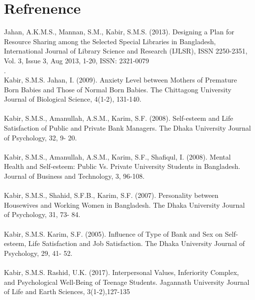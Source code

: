 \documentclass[conference]{IEEEtran}
\begin{document}
 


\section{\textbf{Refrenence}}
Jahan, A.K.M.S., Mannan, S.M.,  Kabir, S.M.S. (2013). Designing a Plan for Resource 
Sharing among the Selected Special Libraries in Bangladesh, International Journal of 
Library Science and Research (IJLSR), ISSN 2250-2351, Vol. 3, Issue 3, Aug 2013, 1-20, 
ISSN: 2321-0079\\.
\\
Kabir, S.M.S.  Jahan, I. (2009). Anxiety Level between Mothers of Premature Born Babies 
and Those of Normal Born Babies. The Chittagong University Journal of Biological 
Science, 4(1-2), 131-140.\\
\\
Kabir, S.M.S., Amanullah, A.S.M.,  Karim, S.F. (2008). Self-esteem and Life Satisfaction of 
Public and Private Bank Managers. The Dhaka University Journal of Psychology, 32, 9-
20.\\ 
\\
Kabir, S.M.S., Amanullah, A.S.M., Karim, S.F.,  Shafiqul, I. (2008). Mental Health and Self-esteem: Public Vs. Private University Students in Bangladesh. Journal of Business and 
Technology, 3, 96-108.\\
\\
Kabir, S.M.S., Shahid, S.F.B.,  Karim, S.F. (2007). Personality between Housewives and 
Working Women in Bangladesh. The Dhaka University Journal of Psychology, 31, 73-
84. \\
\\
Kabir, S.M.S. Karim, S.F. (2005). Influence of Type of Bank and Sex on Self-esteem, Life 
Satisfaction and Job Satisfaction. The Dhaka University Journal of Psychology, 29, 41-
52.\\
\\
Kabir, S.M.S.  Rashid, U.K. (2017). Interpersonal Values, Inferiority Complex, and 
Psychological Well-Being of Teenage Students. Jagannath University Journal of Life and 
Earth Sciences, 3(1-2),127-135\\
\\



	






	
\end{document}
